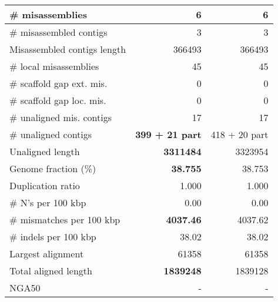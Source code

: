 \documentclass[12pt,a4paper]{article}
\begin{document}
\begin{table}[ht]
\begin{center}
\begin{tabular}{|l*{2}{|r}|}
\# misassemblies & 6 & 6 \\ \hline
\# misassembled contigs & 3 & 3 \\ \hline
Misassembled contigs length & 366493 & 366493 \\ \hline
\# local misassemblies & 45 & 45 \\ \hline
\# scaffold gap ext. mis. & 0 & 0 \\ \hline
\# scaffold gap loc. mis. & 0 & 0 \\ \hline
\# unaligned mis. contigs & 17 & 17 \\ \hline
\# unaligned contigs & {\bf 399 + 21 part} & 418 + 20 part \\ \hline
Unaligned length & {\bf 3311484} & 3323954 \\ \hline
Genome fraction (\%) & {\bf 38.755} & 38.753 \\ \hline
Duplication ratio & 1.000 & 1.000 \\ \hline
\# N's per 100 kbp & 0.00 & 0.00 \\ \hline
\# mismatches per 100 kbp & {\bf 4037.46} & 4037.62 \\ \hline
\# indels per 100 kbp & 38.02 & 38.02 \\ \hline
Largest alignment & 61358 & 61358 \\ \hline
Total aligned length & {\bf 1839248} & 1839128 \\ \hline
NGA50 & - & - \\ \hline
\end{tabular}
\end{center}
\end{table}
\end{document}

